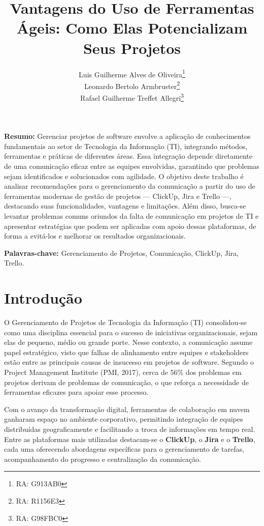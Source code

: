 \documentclass[12pt]{article}
\title{Vantagens do Uso de Ferramentas Ágeis: Como Elas Potencializam Seus Projetos}
\author{
Luis Guilherme Alves de Oliveira\thanks{ RA: G913AB0} \\
Leonardo Bertolo Armbruster\thanks{ RA: R1156E3} \\
Rafael Guilherme Treffet Allegri\thanks{ RA: G98FBC0}
}
\date{} %
\begin{document}
\maketitle
\vspace{0.5cm}

\noindent
\newpage
\textbf{Resumo:}
Gerenciar projetos de software envolve a aplicação de conhecimentos fundamentais ao setor de Tecnologia da Informação (TI), integrando métodos, ferramentas e práticas de diferentes áreas. Essa integração depende diretamente de uma comunicação eficaz entre as equipes envolvidas, garantindo que problemas sejam identificados e solucionados com agilidade. O objetivo deste trabalho é analisar recomendações para o gerenciamento da comunicação a partir do uso de ferramentas modernas de gestão de projetos — ClickUp, Jira e Trello —, destacando suas funcionalidades, vantagens e limitações. Além disso, busca-se levantar problemas comuns oriundos da falta de comunicação em projetos de TI e apresentar estratégias que podem ser aplicadas com apoio dessas plataformas, de forma a evitá-los e melhorar os resultados organizacionais.

\vspace{0.5cm}

\noindent
\textbf{Palavras-chave:} Gerenciamento de Projetos, Comunicação, ClickUp, Jira, Trello.

\clearpage
\tableofcontents

\newpage
\section{Introdução}
O Gerenciamento de Projetos de Tecnologia da Informação (TI) consolidou-se como uma disciplina essencial para o sucesso de iniciativas organizacionais, sejam elas de pequeno, médio ou grande porte. Nesse contexto, a comunicação assume papel estratégico, visto que falhas de alinhamento entre equipes e stakeholders estão entre as principais causas de insucesso em projetos de software. Segundo o Project Management Institute (PMI, 2017), cerca de 56\% dos problemas em projetos derivam de problemas de comunicação, o que reforça a necessidade de ferramentas eficazes para apoiar esse processo.

Com o avanço da transformação digital, ferramentas de colaboração em nuvem ganharam espaço no ambiente corporativo, permitindo integração de equipes distribuídas geograficamente e facilitando a troca de informações em tempo real. Entre as plataformas mais utilizadas destacam-se o \textbf{ClickUp}, o \textbf{Jira} e o \textbf{Trello}, cada uma oferecendo abordagens específicas para o gerenciamento de tarefas, acompanhamento do progresso e centralização da comunicação.
\end{document}
